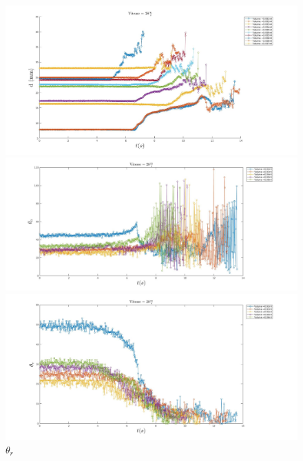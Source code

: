 \begin{figure}[!h]
	\begin{minipage}{0.95\linewidth}
	\includegraphics[width = \linewidth]{./image/v=28d.jpg}
	\caption{$d$}
	\end{minipage}
	\begin{minipage}{0.95\linewidth}
	\includegraphics[width = \linewidth]{./image/v=28oa_2.jpg}
	\caption{$\theta_{a}$}
	\end{minipage}
	\begin{minipage}{0.95\linewidth}
	\includegraphics[width = \linewidth]{./image/v=28or_2.jpg}
	\caption{$\theta_{r}$}
	\end{minipage}
\end{figure}

